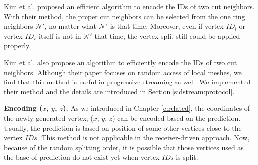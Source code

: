     Kim et al. \cite{multiresolution:kim} proposed an efficient algorithm to encode the IDs
    of two cut neighbors. With their method, the proper cut neighbors can be selected from
    the one ring neighbors $\mathcal{N}'$, no matter what $\mathcal{N}'$ is that time. 
    Moreover, even if vertex $ID_l$ or vertex $ID_r$ itself is not in $\mathcal{N'}$ that
    time, the vertex split still could be applied properly.

    Kim et al. \cite{multiresolution:kim} also propose an algorithm
    to efficiently encode the IDs of two cut neighbors.
    Although their paper focuses on random access of local meshes, we find that this 
	method is useful in progressive streaming as well. We implemented their method and
    the details are introduced in Section \ref{s:dstream:protocol}.
    
    \textbf{Encoding ($x$, $y$, $z$).}
    As we introduced in Chapter \ref{c:related}, the coordinates of the newly generated
    vertex, ($x$, $y$, $z$) can be encoded based on the prediction. Usually, the prediction
    is based on position of some other vertices close to the vertex $IDs$. This method is 
    not applicable in the receiver-driven approach. Now, because of the random splitting order, 
    it is possible that those vertices used as the base of prediction 
    do not exist yet when vertex $IDs$ is split. 
    
